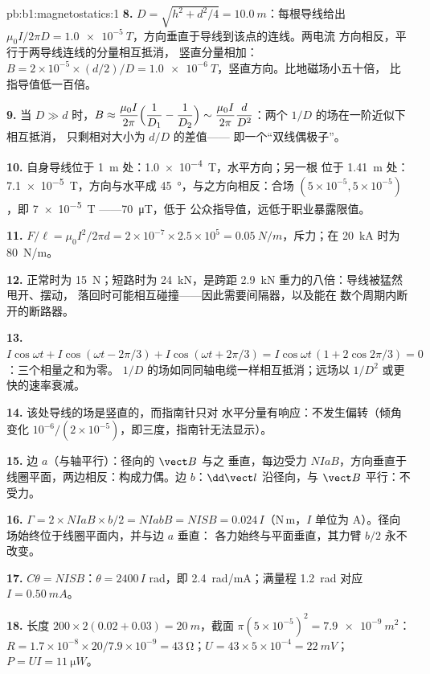 \begin{solution}{pb:b1:magnetostatics:1}
\textbf{8.} $D = \sqrt{h^2 + d^2/4} = \qty{10.0}{m}$：每根导线给出 $\mu_0I/2\pi D =
\qty{1.0e-5}{T}$，方向垂直于导线到该点的连线。两电流
方向相反，平行于两导线连线的分量相互抵消，
竖直分量相加：$B = 2 \times 10^{-5} \times
(d/2)/D = \qty{1.0e-6}{T}$，竖直方向。比地磁场小五十倍，
比指导值低一百倍。

\textbf{9.} 当 $D \gg d$ 时，$B \approx \dfrac{\mu_0I}{2\pi}\Bigl(\dfrac1{D_1} - \dfrac1{D_2}\Bigr)
\sim \dfrac{\mu_0I}{2\pi}\dfrac{d}{D^2}$：两个 $1/D$ 的场在一阶近似下相互抵消，
只剩相对大小为 $d/D$ 的差值——
即一个“双线偶极子”。

\textbf{10.} 自身导线位于 \qty{1}{m} 处：\qty{1.0e-4}{T}，水平方向；另一根
位于 \qty{1.41}{m} 处：\qty{7.1e-5}{T}，方向与水平成 \qty{45}{\degree}，与之方向相反：合场
$(5 \times 10^{-5}, 5 \times 10^{-5})$，即 \qty{7e-5}{T} ——\qty{70}{\micro T}，低于
公众指导值，远低于职业暴露限值。

\textbf{11.} $F/\ell = \mu_0I^2/2\pi d = 2 \times 10^{-7} \times 2.5 \times 10^5 =
\qty{0.05}{N/m}$，斥力；在 \qty{20}{kA} 时为 \qty{80}{N/m}。

\textbf{12.} 正常时为 \qty{15}{N}；短路时为 \qty{24}{kN}，是跨距
\qty{2.9}{kN} 重力的八倍：导线被猛然甩开、摆动，
落回时可能相互碰撞——因此需要间隔器，以及能在
数个周期内断开的断路器。

\textbf{13.} $I\cos\omega t + I\cos(\omega t - 2\pi/3) + I\cos(\omega t + 2\pi/3) =
I\cos\omega t\,(1 + 2\cos2\pi/3) = 0$：三个相量之和为零。
$1/D$ 的场如同同轴电缆一样相互抵消；远场以 $1/D^2$
或更快的速率衰减。

\textbf{14.} 该处导线的场是竖直的，而指南针只对
水平分量有响应：不发生偏转（倾角变化
$10^{-6}/(2 \times 10^{-5})$，即三度，指南针无法显示）。

\textbf{15.} 边 $a$（与轴平行）：径向的 $\vect B$ 与之
垂直，每边受力 $NIaB$，方向垂直于
线圈平面，两边相反：构成力偶。边 $b$：$\dd\vect l$
沿径向，与 $\vect B$ 平行：不受力。

\textbf{16.} $\Gamma = 2 \times NIaB \times b/2 = NIabB = NISB = 0.024\,I$（N\,m，$I$
单位为 A）。径向场始终位于线圈平面内，并与边 $a$ 垂直：
各力始终与平面垂直，其力臂
$b/2$ 永不改变。

\textbf{17.} $C\theta = NISB$：$\theta = 2400\,I$ rad，即 \qty{2.4}{rad/mA}；满量程
\qty{1.2}{rad} 对应 $I = \qty{0.50}{mA}$。

\textbf{18.} 长度 $200 \times 2(0.02 + 0.03) = \qty{20}{m}$，截面 $\pi(5 \times
10^{-5})^2 = \qty{7.9e-9}{m^2}$：$R = 1.7 \times 10^{-8} \times 20/7.9 \times 10^{-9} =
\qty{43}{\ohm}$；$U = 43 \times 5 \times 10^{-4} = \qty{22}{mV}$；$P = UI = \qty{11}{\micro W}$。


\end{solution}
